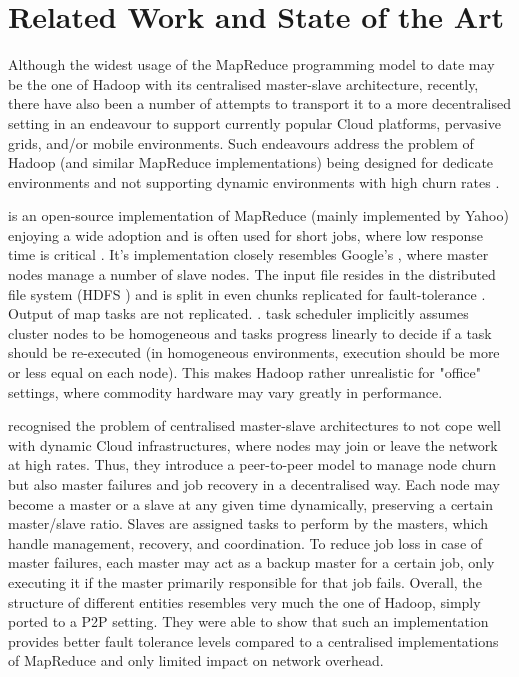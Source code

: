 \chapter{Related Work and State of the Art}
Although the widest usage of the MapReduce programming model to date may be the one of Hadoop \cite{Hadoop} with its centralised master-slave architecture, recently, there have also been a number of attempts to transport it to a more decentralised setting in an endeavour to support currently popular Cloud platforms, pervasive grids, and/or mobile environments. Such endeavours address the problem of Hadoop (and similar MapReduce implementations) being designed for dedicate environments and not supporting dynamic environments with high churn rates \cite{CReSTIC-2677}.

\cite{Hadoop} is an open-source implementation of MapReduce (mainly implemented by Yahoo) enjoying a wide adoption and is often used for short jobs, where low response time is critical \cite{Zaharia:2008:IMP:1855741.1855744}. It's implementation closely resembles Google's \cite{Dean2008}, where master nodes manage a number of slave nodes. The input file resides in the distributed file system (HDFS \cite{Lin:2010:MMO:1851476.1851489}) and is split in even chunks replicated for fault-tolerance \cite{Zaharia:2008:IMP:1855741.1855744}. Output of map tasks are not replicated. \cite{Lin:2010:MMO:1851476.1851489}. task scheduler implicitly assumes cluster nodes to be homogeneous and tasks progress linearly to decide if a task should be re-executed (in homogeneous environments, execution should be more or less equal on each node). This makes Hadoop rather unrealistic for "office" settings, where commodity hardware may vary greatly in performance. 

\cite{Marozzo2012a} recognised the problem of centralised master-slave architectures to not cope well with dynamic Cloud infrastructures, where nodes may join or leave the network at high rates. Thus, they introduce a peer-to-peer model to manage node churn but also master failures and job recovery in a decentralised way. Each node may become a master or a slave at any given time dynamically, preserving a certain master/slave ratio. Slaves are assigned tasks to perform by the masters, which handle management, recovery, and coordination. To reduce job loss in case of master failures, each master may act as a backup master for a certain job, only executing it if the master primarily responsible for that job fails. Overall, the structure of different entities resembles very much the one of Hadoop, simply ported to a P2P setting. They were able to show that such an implementation provides better fault tolerance levels compared to a centralised implementations of MapReduce and only limited impact on network overhead. 


